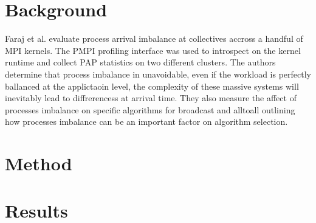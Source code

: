 \section{Background}

Faraj et al. \cite{Faraj2008StudyProcArrivalMPIColl} evaluate process arrival imbalance at collectives accross a handful of MPI kernels.
The PMPI profiling interface was used to introspect on the kernel runtime and collect PAP statistics on two different clusters.
The authors determine that process imbalance in unavoidable, even if the workload is perfectly ballanced at the applictaoin level, the complexity of these massive systems will inevitably lead to diffrerencess at arrival time. 
They also measure the affect of processes imbalance on specific algorithms for broadcast and alltoall outlining how processes imbalance can be an important factor on algorithm selection.

\section{Method}


\section{Results}

